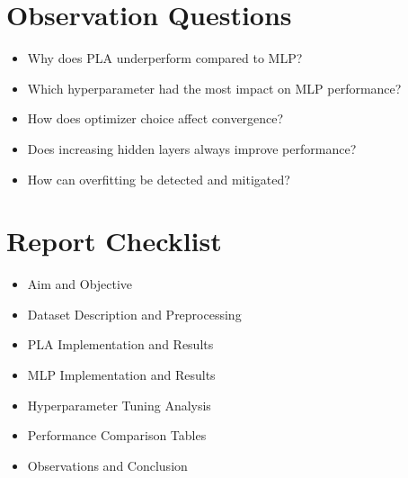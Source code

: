\documentclass[11pt]{article}
\begin{document}
\section*{Observation Questions}
\begin{itemize}
    \item Why does PLA underperform compared to MLP?
    \item Which hyperparameter had the most impact on MLP performance?
    \item How does optimizer choice affect convergence?
    \item Does increasing hidden layers always improve performance?
    \item How can overfitting be detected and mitigated?
\end{itemize}

\section*{Report Checklist}
\begin{itemize}
    \item Aim and Objective
    \item Dataset Description and Preprocessing
    \item PLA Implementation and Results
    \item MLP Implementation and Results
    \item Hyperparameter Tuning Analysis
    \item Performance Comparison Tables
    \item Observations and Conclusion
\end{itemize}
\end{document}
